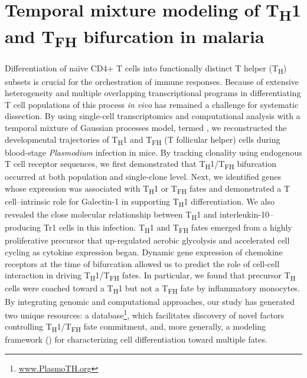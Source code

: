 
\chapter{Temporal mixture modeling of \texorpdfstring{T\textsubscript{H}\textnormal{1} and T\textsubscript{FH}}{TH1 and TFH} bifurcation in malaria} \label{ch:malaria}

\graphicspath{{Chapter4/Figs/}}

Differentiation of na\"{i}ve CD4+ T cells into functionally distinct T helper (T\textsubscript{H}) subsets is crucial for the orchestration of immune responses. Because of extensive heterogeneity and multiple overlapping transcriptional programs in differentiating T cell populations of this process \textit{in vivo} has remained a challenge for systematic dissection. By using single-cell transcriptomics and computational analysis with a temporal mixture of Gaussian processes model, termed , we reconstructed the developmental trajectories of T\textsubscript{H}1 and T\textsubscript{FH} (T follicular helper) cells during blood-stage \textit{Plasmodium} infection in mice. By tracking clonality using endogenous T cell receptor sequences, we first demonstrated that T\textsubscript{H}1/T\textsubscript{FH} bifurcation occurred at both population and single-clone level. Next, we identified genes whose expression was associated with T\textsubscript{H}1 or T\textsubscript{FH} fates and demonstrated a T cell–intrinsic role for Galectin-1 in supporting T\textsubscript{H}1 differentiation. We also revealed the close molecular relationship between T\textsubscript{H}1 and interleukin-10–producing Tr1 cells in this infection. T\textsubscript{H}1 and T\textsubscript{FH} fates emerged from a highly proliferative precursor that up-regulated aerobic glycolysis and accelerated cell cycling as cytokine expression began. Dynamic gene expression of chemokine receptors at the time of bifurcation allowed us to predict the role of cell-cell interaction in driving T\textsubscript{H}1/T\textsubscript{FH} fates. In particular, we found that precursor T\textsubscript{H} cells were coached toward a T\textsubscript{H}1 but not a T\textsubscript{FH} fate by inflammatory monocytes. By integrating genomic and computational approaches, our study has generated two unique resources: a database\footnote{\url{www.PlasmoTH.org}}, which facilitates discovery of novel factors controlling T\textsubscript{H}1/T\textsubscript{FH} fate commitment, and, more generally, a modeling framework () for characterizing cell differentiation toward multiple fates.

